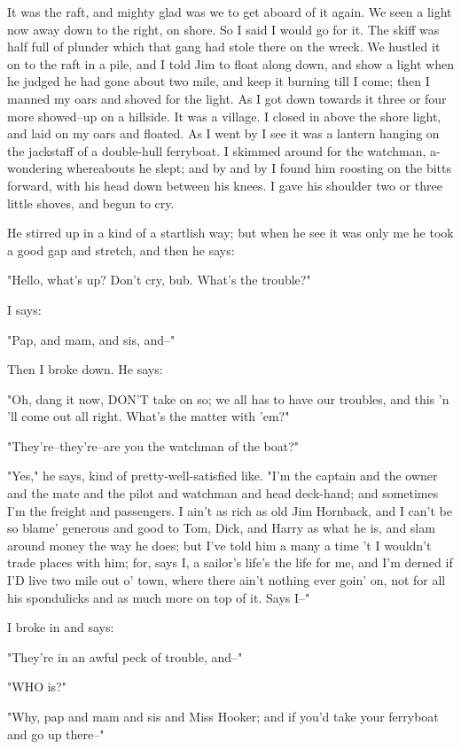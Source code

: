 It was the raft, and mighty glad was we to get aboard of it again.  We
seen a light now away down to the right, on shore.  So I said I would go
for it. The skiff was half full of plunder which that gang had stole
there on the wreck.  We hustled it on to the raft in a pile, and I told
Jim to float along down, and show a light when he judged he had gone
about two mile, and keep it burning till I come; then I manned my oars
and shoved for the light.  As I got down towards it three or four more
showed--up on a hillside.  It was a village.  I closed in above the shore
light, and laid on my oars and floated.  As I went by I see it was a
lantern hanging on the jackstaff of a double-hull ferryboat.  I skimmed
around for the watchman, a-wondering whereabouts he slept; and by and by
I found him roosting on the bitts forward, with his head down between his
knees.  I gave his shoulder two or three little shoves, and begun to cry.

He stirred up in a kind of a startlish way; but when he see it was only
me he took a good gap and stretch, and then he says:

"Hello, what's up?  Don't cry, bub.  What's the trouble?"

I says:

"Pap, and mam, and sis, and--"

Then I broke down.  He says:

"Oh, dang it now, DON'T take on so; we all has to have our troubles, and
this 'n 'll come out all right.  What's the matter with 'em?"

"They're--they're--are you the watchman of the boat?"

"Yes," he says, kind of pretty-well-satisfied like.  "I'm the captain and
the owner and the mate and the pilot and watchman and head deck-hand; and
sometimes I'm the freight and passengers.  I ain't as rich as old Jim
Hornback, and I can't be so blame' generous and good to Tom, Dick, and
Harry as what he is, and slam around money the way he does; but I've told
him a many a time 't I wouldn't trade places with him; for, says I, a
sailor's life's the life for me, and I'm derned if I'D live two mile out
o' town, where there ain't nothing ever goin' on, not for all his
spondulicks and as much more on top of it.  Says I--"

I broke in and says:

"They're in an awful peck of trouble, and--"

"WHO is?"

"Why, pap and mam and sis and Miss Hooker; and if you'd take your
ferryboat and go up there--"

